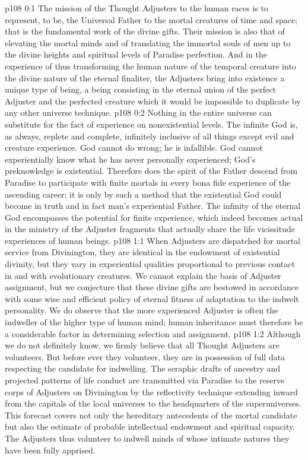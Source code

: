 \author{Solitary Messenger}
\vs p108 0:1 The mission of the Thought Adjusters to the human races is to represent, to be, the Universal Father to the mortal creatures of time and space; that is the fundamental work of the divine gifts. Their mission is also that of elevating the mortal minds and of translating the immortal souls of men up to the divine heights and spiritual levels of Paradise perfection. And in the experience of thus transforming the human nature of the temporal creature into the divine nature of the eternal finaliter, the Adjusters bring into existence a unique type of being, a being consisting in the eternal union of the perfect Adjuster and the perfected creature which it would be impossible to duplicate by any other universe technique.
\pc \vs p108 0:2 Nothing in the entire universe can substitute for the fact of experience on nonexistential levels. The infinite God is, as always, replete and complete, infinitely inclusive of all things except evil and creature experience. God cannot do wrong; he is infallible. God cannot experientially know what he has never personally experienced; God’s preknowledge is existential. Therefore does the spirit of the Father descend from Paradise to participate with finite mortals in every bona fide experience of the ascending career; it is only by such a method that the existential God could become in truth and in fact man’s experiential Father. The infinity of the eternal God encompasses the potential for finite experience, which indeed becomes actual in the ministry of the Adjuster fragments that actually share the life vicissitude experiences of human beings.
\vs p108 1:1 When Adjusters are dispatched for mortal service from Divinington, they are identical in the endowment of existential divinity, but they vary in experiential qualities proportional to previous contact in and with evolutionary creatures. We cannot explain the basis of Adjuster assignment, but we conjecture that these divine gifts are bestowed in accordance with some wise and efficient policy of eternal fitness of adaptation to the indwelt personality. We do observe that the more experienced Adjuster is often the indweller of the higher type of human mind; human inheritance must therefore be a considerable factor in determining selection and assignment.
\vs p108 1:2 Although we do not definitely know, we firmly believe that all Thought Adjusters are volunteers. But before ever they volunteer, they are in possession of full data respecting the candidate for indwelling. The seraphic drafts of ancestry and projected patterns of life conduct are transmitted via Paradise to the reserve corps of Adjusters on Divinington by the reflectivity technique extending inward from the capitals of the local universes to the headquarters of the superuniverses. This forecast covers not only the hereditary antecedents of the mortal candidate but also the estimate of probable intellectual endowment and spiritual capacity. The Adjusters thus volunteer to indwell minds of whose intimate natures they have been fully apprised.
